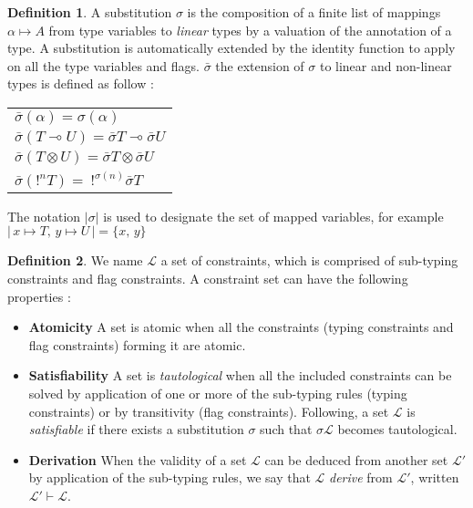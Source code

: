 \documentclass[10pt]{article}
\theoremstyle{plain}
\theoremstyle{definition}
\newtheorem{defn}{Definition}[subsection] %
\begin{document}
\begin{defn} A substitution $\sigma$ is the composition of a finite list of mappings $\alpha \mapsto A$ from type variables to
	\textit{linear} types 	by a valuation of the annotation of a type. A substitution is automatically extended by the identity function
	to apply on all the type variables and flags.
	$\bar{\sigma}$ the extension of $\sigma$ to linear and non-linear types is defined as follow :
 		\begin{center}
 		\begin{tabular}{l}
 			$\bar{\sigma}(\alpha) = \sigma(\alpha)$ \\
 			$\bar{\sigma}(T \multimap U) = \bar{\sigma}T \multimap \bar{\sigma}U$ \\
 			$\bar{\sigma}(T \otimes U) = \bar{\sigma}T \otimes \bar{\sigma}U$ \\
 			$\bar{\sigma}(!^n T) = ~ !^{\sigma(n)} \bar{\sigma}T$
 		\end{tabular}
 		\end{center}
 	The notation $|\sigma|$ is used to designate the set of mapped variables, for example
 	$ | \,x \mapsto T, \, y \mapsto U\,| = \{ x, \,y \} $
\end{defn}

\begin{defn} We name $\mathcal{L}$ a set of constraints, which is comprised of sub-typing constraints
  and flag constraints. A constraint set can have the following properties :
  \begin{itemize}
  	\item[]{\bf Atomicity} A set is atomic when all the constraints (typing constraints and flag constraints) forming it are atomic.
  	\item[]{\bf Satisfiability} A set is \textit{tautological} when all the included constraints can be solved by application of one or
  		more of the sub-typing rules (typing constraints) or by transitivity (flag constraints).
  		Following, a set $\mathcal{L}$ is \textit{satisfiable} if there exists a substitution $\sigma$ such that $\sigma \mathcal{L}$
	 		becomes tautological.
	 	\item[]{\bf Derivation} When the validity of a set $\mathcal{L}$ can be deduced from another set $\mathcal{L'}$ by application of
		  the sub-typing rules, we say that $\mathcal{L}$ \textit{derive} from $\mathcal{L'}$, written $\mathcal{L'} \vdash \mathcal{L}$.
  \end{itemize}
\end{defn}
\end{document}
